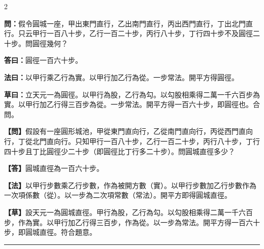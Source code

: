 \documentclass[11pt,a4paper]{article}
\newcommand{\longline}{\noindent\rule{\textwidth}{0.4pt}}
\newcommand{\wenC}[1]{\par\noindent\textbf{\textcolor{probcolor}{問：}}{#1}\par}
\newcommand{\daC}[1]{\par\noindent\textbf{\textcolor{anscolor}{答曰：}}{#1}\par}
\newcommand{\fayueC}[1]{\par\noindent\textbf{\textcolor{methodcolor}{法曰：}}{#1}\par}
\newcommand{\caoyueC}[1]{\par\noindent\textbf{草曰：}{#1}\par}
\newcommand{\wenM}[1]{\par\noindent\textbf{\textcolor{probcolor}{【問】}}{#1}\par}
\newcommand{\daM}[1]{\par\noindent\textbf{\textcolor{anscolor}{【答】}}{#1}\par}
\newcommand{\fayueM}[1]{\par\noindent\textbf{\textcolor{methodcolor}{【法】}}{#1}\par}
\newcommand{\caoyueM}[1]{\par\noindent\textbf{【草】}{#1}\par}
\begin{document}
\begin{paracol}{2}

\wenC{假令圓城一座，甲出東門直行，乙出南門直行，丙出西門直行，丁出北門直行。只云甲行一百八十步，乙行一百二十步，丙行八十步，丁行四十步不及圓徑二十步。問圓徑幾何？}

\daC{圓徑一百六十步。}

\fayueC{以甲行乘乙行為實。以甲行加乙行為從。一步常法。開平方得圓徑。}

\caoyueC{立天元一為圓徑。以甲行為股，乙行為勾。以勾股相乘得二萬一千六百步為實。以甲行加乙行得三百步為從。一步常法。開平方得一百六十步，即圓徑也。合問。}

\switchcolumn

\wenM{假設有一座圓形城池，甲從東門直向行，乙從南門直向行，丙從西門直向行，丁從北門直向行。只知甲行一百八十步，乙行一百二十步，丙行八十步，丁行四十步且丁比圓徑少二十步（即圓徑比丁行多二十步）。問圓城直徑多少？}

\daM{圓城直徑為一百六十步。}

\fayueM{以甲行步數乘乙行步數，作為被開方數（實）。以甲行步數加乙行步數作為一次項係數（從）。以一步為二次項常數（常法）。開平方即得圓城直徑。}

\caoyueM{設天元一為圓城直徑。甲行為股，乙行為勾。以勾股相乘得二萬一千六百步，作為實。以甲行加乙行得三百步，作為從。以一步為常法。開平方得一百六十步，即圓城直徑。符合題意。}

\end{paracol}

\vspace{0.3cm}
\longline
\end{document}
